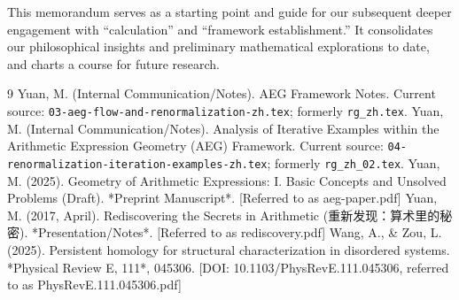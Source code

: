 \documentclass[12pt]{article}
\begin{document}
This memorandum serves as a starting point and guide for our subsequent deeper engagement with ``calculation'' and ``framework establishment.'' It consolidates our philosophical insights and preliminary mathematical explorations to date, and charts a course for future research.

\begin{thebibliography}{9}
     Yuan, M. (Internal Communication/Notes). AEG Framework Notes. Current source: \texttt{03-aeg-flow-and-renormalization-zh.tex}; formerly \texttt{rg\_zh.tex}.
     Yuan, M. (Internal Communication/Notes). Analysis of Iterative Examples within the Arithmetic Expression Geometry (AEG) Framework. Current source: \texttt{04-renormalization-iteration-examples-zh.tex}; formerly \texttt{rg\_zh\_02.tex}.
     Yuan, M. (2025). Geometry of Arithmetic Expressions: I. Basic Concepts and Unsolved Problems (Draft). *Preprint Manuscript*. [Referred to as aeg-paper.pdf]
     Yuan, M. (2017, April). Rediscovering the Secrets in Arithmetic (重新发现：算术里的秘密). *Presentation/Notes*. [Referred to as rediscovery.pdf]
     Wang, A., \& Zou, L. (2025). Persistent homology for structural characterization in disordered systems. *Physical Review E, 111*, 045306. [DOI: 10.1103/PhysRevE.111.045306, referred to as PhysRevE.111.045306.pdf]
\end{thebibliography}
\end{document}

